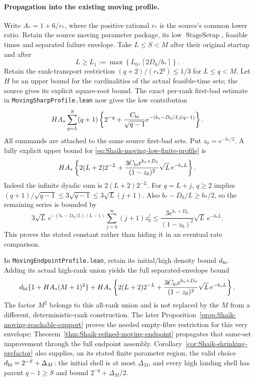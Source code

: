 \paragraph{Propagation into the existing moving profile.}
Write \(A_*=1+6/r_*\), where the positive rational \(r_*\) is the
source's common lower ratio. Retain the source moving parameter
package, its low \(\operatorname{StageSetup}\), feasible times and
separated failure envelope. Take \(L\le S<M\) after their original
startup and after
\[
 L\ge L_1:=\max\left\{L_0,\left\lceil 2D_0/b_*\right\rceil\right\}.
\]
Retain the rank-transport restriction
\((q+2)/(r_*2^q)\le1/3\) for \(L\le q<M\).
Let \(H\) be an upper bound for the cardinalities of the actual
feasible-time sets; the source gives its explicit square-root bound.
The exact per-rank first-bad estimate in
\texttt{MovingSharpProfile.lean} now gives the low contribution
\begin{equation}\label{eq:Shaik-moving-low-finite-profile}
 H A_*\sum_{q=L}^S(q+1)
 \left\{2^{-q}+\frac{C_{\rm lo}}{\sqrt{q-1}}
                 e^{-(b_*-D_0/L)(q-1)}\right\}.
\end{equation}
All summands are attached to the same source first-bad sets.
Put \(z_0=e^{-b_*/2}\). A fully explicit upper bound for
\eqref{eq:Shaik-moving-low-finite-profile} is
\begin{equation}\label{eq:Shaik-moving-low-explicit-profile}
 H A_*\left\{
  2(L+2)2^{-L}
  +\frac{3C_{\rm lo}e^{b_*+D_0}}{(1-z_0)^2}
                          \sqrt L\,e^{-b_*L}\right\}.
\end{equation}
Indeed the infinite dyadic sum is \(2(L+2)2^{-L}\).
For \(q=L+j\), \(q\ge2\) implies
\((q+1)/\sqrt{q-1}\le3\sqrt{q-1}\le3\sqrt L(j+1)\).
Also \(b_*-D_0/L\ge b_*/2\), so the remaining series is bounded by
\[
 3\sqrt L\,e^{-(b_*-D_0/L)(L-1)}
       \sum_{j=0}^{\infty}(j+1)z_0^j
 \le \frac{3e^{b_*+D_0}}{(1-z_0)^2}\sqrt L\,e^{-b_*L}.
\]
This proves the stated constant rather than hiding it in an eventual
rate comparison.

In \texttt{MovingEndpointProfile.lean}, retain its initial/high
density bound \(d_{\rm hi}\). Adding its actual high-rank union yields
the full separated-envelope bound
\[
 d_{\rm hi}\{1+H A_*(M+1)^2\}
 +H A_*\left\{2(L+2)2^{-L}
  +\frac{3C_{\rm lo}e^{b_*+D_0}}{(1-z_0)^2}
                         \sqrt L\,e^{-b_*L}\right\}.
\]
The factor \(M^2\) belongs to this all-rank union and is not replaced
by the \(M\) from a different, deterministic-rank construction.
The later Proposition~\ref{prop:Shaik-moving-reachable-support} proves
the needed empty-fibre restriction for this very envelope;
Theorem~\ref{thm:Shaik-refined-moving-endpoint} propagates that
same-set improvement through the full endpoint assembly.
Corollary~\ref{cor:Shaik-shrinking-prefactor} also supplies, on its
stated finite parameter region, the valid choice
\(d_{\rm hi}=2^{-S}+\Delta_M\): the initial shell is at most
\(\Delta_M\), and every high landing shell has parent \(q-1\ge S\)
and bound \(2^{-q}+\Delta_M/2\).

